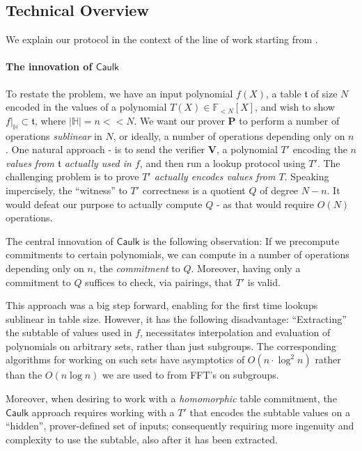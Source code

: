 \documentclass[11pt]{article} %
\newcommand{\caulk}{\ensuremath{\mathsf{Caulk}}\xspace}
\newcommand{\F}{\ensuremath{\mathbb F}\xspace}
\newcommand{\prv}{\ensuremath{\mathsf{\mathbf{P}}}\xspace}
\newcommand{\ver}{\ensuremath{\mathsf{\mathbf{V}}}\xspace}
\newcommand{\polysofdeg}[1]{\ensuremath{\F_{< #1}[X]}\xspace}
\newcommand{\restricttoset}[2]{\ensuremath{#1|_{#2}}\xspace}
\newcommand{\subspace}{\ensuremath{\mathbb{H}}\xspace}
\newcommand{\witsize}{\ensuremath{n}\xspace}
\newcommand{\witruntime}{\ensuremath{\witsize\log\witsize}\xspace}
\newcommand{\tabsize}{\ensuremath{N}\xspace}
\newcommand{\tab}{\ensuremath{\mathfrak{t}}\xspace}
\begin{document}
\subsection{Technical Overview}
We explain our protocol in the context of the line of work starting from \cite{caulk}.
\paragraph{The innovation of \caulk}
To restate the problem, we have an input polynomial $f(X)$,  a table \tab of size \tabsize encoded in the values of 
a polynomial $T(X)\in \polysofdeg{\tabsize}$, and wish to show $\restricttoset{f}{\subspace}\subset \tab$, where $|\subspace|=\witsize << \tabsize$.
We want our prover \prv to perform a number of operations \emph{sublinear} in \tabsize, or ideally, a number of operations depending only on \witsize. 
One natural approach - is to send  the verifier \ver, a polynomial $T'$ encoding 
the \emph{\witsize values from \tab actually used in $f$}, and then run a lookup protocol using $T'$.
The challenging problem is to prove \emph{$T'$ actually encodes values from $T$}.
Speaking impercisely, the ``witness'' to $T'$ correctness is a quotient $Q$ of degree $\tabsize-\witsize$.
It would defeat our purpose to actually compute $Q$ - as that would require $O(\tabsize)$ operations.

The central innovation of \caulk\cite{caulk} is the following observation: If we precompute commitments to certain polynomials, we can compute in a number of operations depending only on \witsize, the \emph{commitment} to $Q$.
Moreover, having only a commitment to $Q$ suffices to check, via pairings, that $T'$ is valid.




This approach was a big step forward, enabling for the first time lookups sublinear in table size.
However, it has the following disadvantage:
``Extracting'' the subtable of values used in $f$, necessitates interpolation and evaluation of polynomials
on arbitrary sets, rather than just subgroups. The corresponding algorithms for working on such sets have asymptotics of $O(\witsize\cdot \log^2 \witsize)$ rather than the $O(\witruntime)$ we are used to from FFT's on subgroups.

Moreover, when desiring to work with a \emph{homomorphic} table commitment, the \caulk approach requires working
with a $T'$ that encodes the subtable values on a ``hidden'', prover-defined set of inputs; consequently requiring more ingenuity and complexity to use the subtable, also after it has been extracted.
\end{document}
